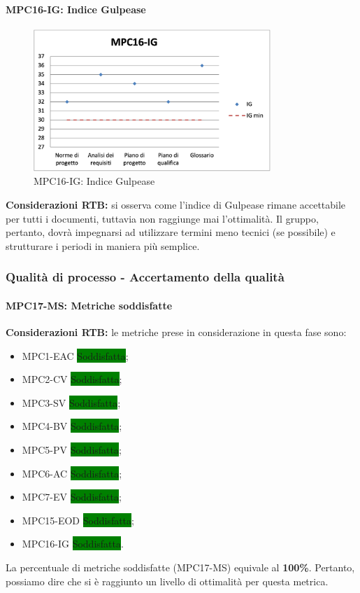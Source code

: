 \paragraph{MPC16-IG: Indice Gulpease}
\begin{figure}[h!] 
    \centering
    \includegraphics[width=0.8\textwidth]{images/MPC16-IG.png}
    \caption{MPC16-IG: Indice Gulpease}
\end{figure}
\noindent \textbf{Considerazioni RTB:} si osserva come l'indice di Gulpease rimane accettabile per tutti i documenti, tuttavia non raggiunge mai l'ottimalità. Il gruppo, pertanto, dovrà impegnarsi ad utilizzare termini meno tecnici (se possibile) e strutturare i periodi in maniera più semplice.

\subsubsection{Qualità di processo - Accertamento della qualità}
\paragraph{MPC17-MS: Metriche soddisfatte} \label{sec:accertamento delle qualita}
\noindent \textbf{Considerazioni RTB:}
le metriche prese in considerazione in questa fase sono:
\begin{itemize}
    \item MPC1-EAC \colorbox{green}{Soddisfatta};
    \item MPC2-CV \colorbox{green}{Soddisfatta};
    \item MPC3-SV \colorbox{green}{Soddisfatta};
    \item MPC4-BV \colorbox{green}{Soddisfatta};
    \item MPC5-PV \colorbox{green}{Soddisfatta};
    \item MPC6-AC \colorbox{green}{Soddisfatta};
    \item MPC7-EV \colorbox{green}{Soddisfatta};
    \item MPC15-EOD \colorbox{green}{Soddisfatta};
    \item MPC16-IG \colorbox{green}{Soddisfatta}.
\end{itemize}
\noindent La percentuale di metriche soddisfatte (MPC17-MS) equivale al \textbf{100\%}. Pertanto, possiamo dire che si è raggiunto un livello di ottimalità per questa metrica.

